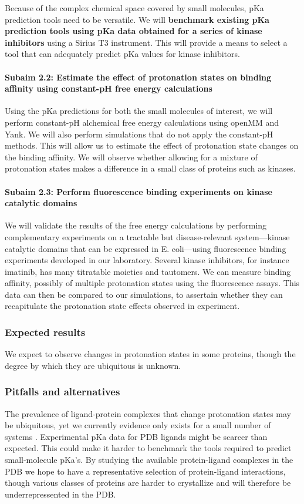 \documentclass[10pt,final]{article}
\newcommand{\subsubsubsection}[1]{\paragraph*{#1}}
\begin{document}
Because of the complex chemical space covered by small molecules, pKa prediction tools need to be versatile. We will \textbf{benchmark existing pKa prediction tools using pKa data obtained for a series of kinase inhibitors} using a Sirius T3 instrument. This will provide a means to select a tool that can adequately predict pKa values for kinase inhibitors.

\subsubsubsection{Subaim 2.2: Estimate the effect of protonation states on binding affinity using constant-pH free energy calculations}
Using the pKa predictions for both the small molecules of interest, we will perform constant-pH alchemical free energy calculations\cite{Mongan2004a} using openMM\cite{Eastman2013a} and Yank. We will also perform simulations that do not apply the constant-pH methods. This will allow us to estimate the effect of protonation state changes on the binding affinity. We will observe whether allowing for a mixture of protonation states makes a difference in a small class of proteins such as kinases.

\subsubsubsection{Subaim 2.3: Perform fluorescence binding experiments on kinase catalytic domains}
We will validate the results of the free energy calculations by performing complementary experiments on a tractable but disease-relevant system---kinase catalytic domains that can be expressed in E. coli---using fluorescence binding experiments developed in our laboratory. Several kinase inhibitors, for instance imatinib, has many titratable moieties and tautomers. We can measure binding affinity, possibly of multiple protonation states using the fluorescence assays. This data can then be compared to our simulations, to assertain whether they can recapitulate the protonation state effects observed in experiment.

\subsubsection*{Expected results}
We expect to observe changes in protonation states in some proteins, though the degree by which they are ubiquitous is unknown.
\subsubsection*{Pitfalls and alternatives}
The prevalence of ligand-protein complexes that change protonation states may be ubiquitous, yet we currently evidence only exists for a small number of systems \cite{Aleksandrov2007a,Czodrowski2007a}.
Experimental pKa data for PDB ligands might be scarcer than expected. This could make it harder to benchmark the tools required to predict small-molecule pKa's.
By studying the available protein-ligand complexes in the PDB we hope to have a representative selection of protein-ligand interactions, though various classes of proteins are harder to crystallize and will therefore be underrepressented in the PDB.
\end{document}

